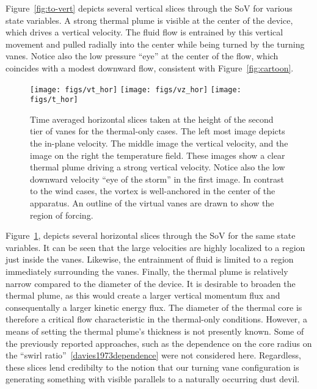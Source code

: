 %
%
%
Figure~\ref{fig:to-vert} depicts several vertical slices through the SoV
for various state variables. A strong thermal plume is visible at the
center of the device, which drives a vertical velocity. The fluid flow
is entrained by this vertical movement and pulled radially into the
center while being turned by the turning vanes. Notice also the low
pressure ``eye'' at the center of the flow, which coincides with a 
modest downward flow, consistent with Figure~\ref{fig:cartoon}. 

\begin{figure}[htb]

 \centering
  \texttt{[image: figs/vt\_hor]}
 \hfill
  \texttt{[image: figs/vz\_hor]}
 \hfill
  \texttt{[image: figs/t\_hor]}
 \caption{Time averaged horizontal slices taken at the height of the
 second tier of vanes for the thermal-only cases. The left most image
 depicts the in-plane velocity. The middle image the vertical velocity,
 and the image on the right the temperature field. These images show a
 clear thermal plume driving a strong vertical velocity. Notice also the
 low downward velocity ``eye of the storm'' in the first image. In
 contrast to the wind cases, the vortex is well-anchored in the center
 of the apparatus. An outline of the virtual vanes are drawn to show the
 region of forcing.}
 \label{fig:to-hor}
\end{figure}

Figure~\ref{fig:to-hor}, depicts several horizontal slices
through the SoV for the same state variables. It can be seen that the
large velocities are highly localized to a region just inside the
vanes. Likewise, the entrainment of fluid is limited to a region
immediately surrounding the vanes.
%
%
Finally, the thermal plume is relatively narrow compared to the diameter
of the device. It is desirable to broaden the thermal plume, as this
would create a larger vertical momentum flux and consequentally a larger
kinetic energy flux.  
The diameter of the thermal core is therefore a critical flow
characteristic in the thermal-only conditions. However, a means of
setting the thermal plume's thickness is not presently 
known. Some of the previously reported approaches, such as the
dependence on the core radius on the  ``swirl
ratio''~\ref{davies1973dependence} were not considered here. 
Regardless, these slices lend credibilty to the 
notion that our turning vane configuration is generating something with  
visible parallels to a naturally occurring dust devil.   

